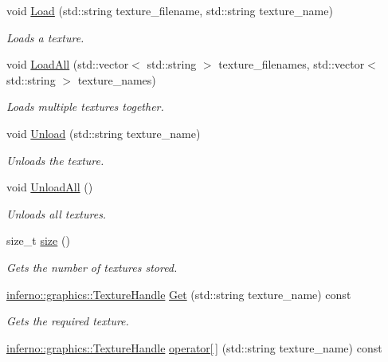 \begin{DoxyCompactItemize}
void \mbox{\hyperlink{classinferno_1_1graphics_1_1_texture_manager_aa8a3d242633cc83fd3fe178520d15cb6}{Load}} (std\+::string texture\+\_\+filename, std\+::string texture\+\_\+name)
\begin{DoxyCompactList}\small\item\em Loads a texture. \end{DoxyCompactList}\item 
void \mbox{\hyperlink{classinferno_1_1graphics_1_1_texture_manager_ae1c0a268b96073bb0c925e3523f2bc58}{Load\+All}} (std\+::vector$<$ std\+::string $>$ texture\+\_\+filenames, std\+::vector$<$ std\+::string $>$ texture\+\_\+names)
\begin{DoxyCompactList}\small\item\em Loads multiple textures together. \end{DoxyCompactList}\item 
void \mbox{\hyperlink{classinferno_1_1graphics_1_1_texture_manager_af860bd092645a0c99afa35d3e978f3d8}{Unload}} (std\+::string texture\+\_\+name)
\begin{DoxyCompactList}\small\item\em Unloads the texture. \end{DoxyCompactList}\item 
void \mbox{\hyperlink{classinferno_1_1graphics_1_1_texture_manager_ab3f3fbf66a7c133ed129e1433b1c7cee}{Unload\+All}} ()
\begin{DoxyCompactList}\small\item\em Unloads all textures. \end{DoxyCompactList}\item 
size\+\_\+t \mbox{\hyperlink{classinferno_1_1graphics_1_1_texture_manager_a7b5b7ee8f6c1a65f63de017a933549ef}{size}} ()
\begin{DoxyCompactList}\small\item\em Gets the number of textures stored. \end{DoxyCompactList}\item 
\mbox{\hyperlink{namespaceinferno_1_1graphics_a9d719bfbfedd17b9ace9b8d603ab5a38}{inferno\+::graphics\+::\+Texture\+Handle}} \mbox{\hyperlink{classinferno_1_1graphics_1_1_texture_manager_ae2b18c9725addce31e35034ea6642fbf}{Get}} (std\+::string texture\+\_\+name) const
\begin{DoxyCompactList}\small\item\em Gets the required texture. \end{DoxyCompactList}\item 
\mbox{\hyperlink{namespaceinferno_1_1graphics_a9d719bfbfedd17b9ace9b8d603ab5a38}{inferno\+::graphics\+::\+Texture\+Handle}} \mbox{\hyperlink{classinferno_1_1graphics_1_1_texture_manager_a419b62740d0cbff686820b9b4ccc95e2}{operator\mbox{[}$\,$\mbox{]}}} (std\+::string texture\+\_\+name) const

\end{DoxyCompactItemize}
